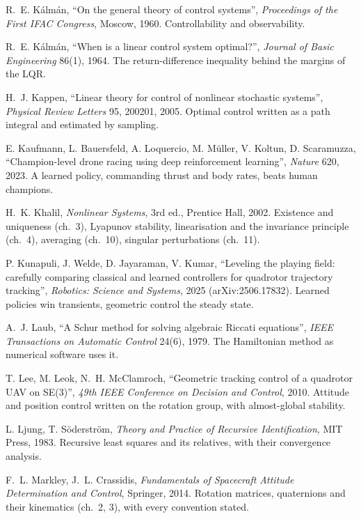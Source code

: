 \begin{description}[leftmargin=1.5em, itemindent=-1.5em, itemsep=5pt, font=\normalfont]
  \item[] R.~E. Kálmán, \enquote{On the general theory of control systems}, \emph{Proceedings of the First IFAC Congress}, Moscow, 1960. Controllability and observability.
  \item[] R.~E. Kálmán, \enquote{When is a linear control system optimal?}, \emph{Journal of Basic Engineering} 86(1), 1964. The return-difference inequality behind the margins of the LQR.
  \item[] H.~J. Kappen, \enquote{Linear theory for control of nonlinear stochastic systems}, \emph{Physical Review Letters} 95, 200201, 2005. Optimal control written as a path integral and estimated by sampling.
  \item[] E. Kaufmann, L. Bauersfeld, A. Loquercio, M. Müller, V. Koltun, D. Scaramuzza, \enquote{Champion-level drone racing using deep reinforcement learning}, \emph{Nature} 620, 2023. A learned policy, commanding thrust and body rates, beats human champions.
  \item[] H.~K. Khalil, \emph{Nonlinear Systems}, 3rd ed., Prentice Hall, 2002. Existence and uniqueness (ch.~3), Lyapunov stability, linearisation and the invariance principle (ch.~4), averaging (ch.~10), singular perturbations (ch.~11).
  \item[] P. Kunapuli, J. Welde, D. Jayaraman, V. Kumar, \enquote{Leveling the playing field: carefully comparing classical and learned controllers for quadrotor trajectory tracking}, \emph{Robotics: Science and Systems}, 2025 (arXiv:2506.17832). Learned policies win transients, geometric control the steady state.
  \item[] A.~J. Laub, \enquote{A Schur method for solving algebraic Riccati equations}, \emph{IEEE Transactions on Automatic Control} 24(6), 1979. The Hamiltonian method as numerical software uses it.
  \item[] T. Lee, M. Leok, N.~H. McClamroch, \enquote{Geometric tracking control of a quadrotor UAV on SE(3)}, \emph{49th IEEE Conference on Decision and Control}, 2010. Attitude and position control written on the rotation group, with almost-global stability.
  \item[] L. Ljung, T. Söderström, \emph{Theory and Practice of Recursive Identification}, MIT Press, 1983. Recursive least squares and its relatives, with their convergence analysis.
  \item[] F.~L. Markley, J.~L. Crassidis, \emph{Fundamentals of Spacecraft Attitude Determination and Control}, Springer, 2014. Rotation matrices, quaternions and their kinematics (ch.~2, 3), with every convention stated.

\end{description}
